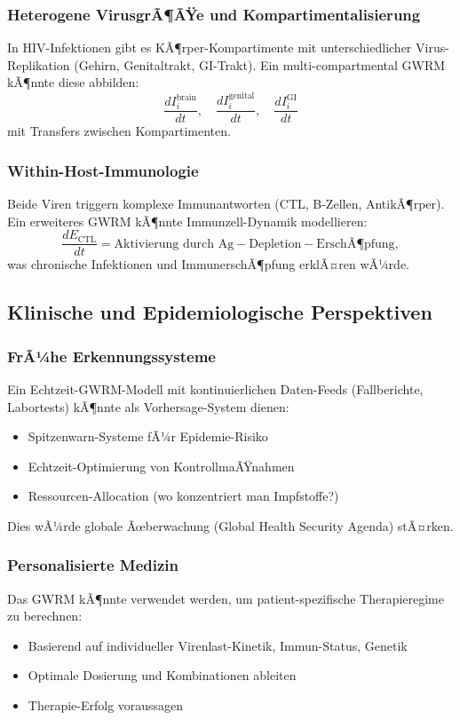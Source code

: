 ﻿\documentclass[a4paper,12pt]{article}
\theoremstyle{definition}
\begin{document}
\subsubsection{Heterogene VirusgrÃ¶ÃŸe und Kompartimentalisierung}
In HIV-Infektionen gibt es KÃ¶rper-Kompartimente mit unterschiedlicher Virus-Replikation (Gehirn, Genitaltrakt, GI-Trakt). Ein multi-compartmental GWRM kÃ¶nnte diese abbilden:
\[
\frac{dI_i^{\text{brain}}}{dt}, \quad \frac{dI_i^{\text{genital}}}{dt}, \quad \frac{dI_i^{\text{GI}}}{dt}
\]
mit Transfers zwischen Kompartimenten.

\subsubsection{Within-Host-Immunologie}
Beide Viren triggern komplexe Immunantworten (CTL, B-Zellen, AntikÃ¶rper). Ein erweiteres GWRM kÃ¶nnte Immunzell-Dynamik modellieren:
\[
\frac{dE_{\text{CTL}}}{dt} = \text{Aktivierung durch Ag} - \text{Depletion} - \text{ErschÃ¶pfung},
\]
was chronische Infektionen und ImmunerschÃ¶pfung erklÃ¤ren wÃ¼rde.

\subsection{Klinische und Epidemiologische Perspektiven}

\subsubsection{FrÃ¼he Erkennungssysteme}
Ein Echtzeit-GWRM-Modell mit kontinuierlichen Daten-Feeds (Fallberichte, Labortests) kÃ¶nnte als Vorhersage-System dienen:
\begin{itemize}
\item Spitzenwarn-Systeme fÃ¼r Epidemie-Risiko
\item Echtzeit-Optimierung von KontrollmaÃŸnahmen
\item Ressourcen-Allocation (wo konzentriert man Impfstoffe?)
\end{itemize}

Dies wÃ¼rde globale Ãœberwachung (Global Health Security Agenda) stÃ¤rken.

\subsubsection{Personalisierte Medizin}
Das GWRM kÃ¶nnte verwendet werden, um patient-spezifische Therapieregime zu berechnen:
\begin{itemize}
\item Basierend auf individueller Virenlast-Kinetik, Immun-Status, Genetik
\item Optimale Dosierung und Kombinationen ableiten
\item Therapie-Erfolg voraussagen
\end{itemize}
\end{document}
